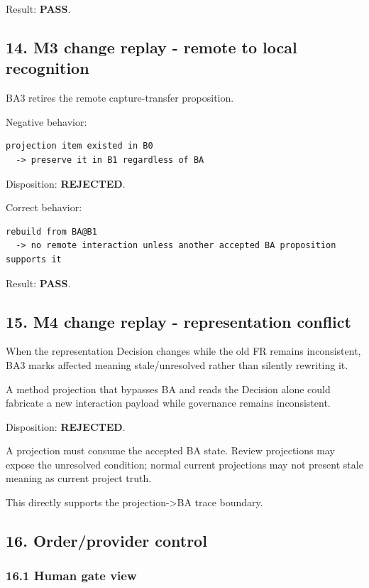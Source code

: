 \documentclass[11pt,a4paper]{article}
\begin{document}
Result: \textbf{PASS}.

\subsection{14. M3 change replay - remote to local recognition}\label{14-m3-change-replay---remote-to-local-recognition}

BA3 retires the remote capture-transfer proposition.

Negative behavior:

\begin{verbatim}
projection item existed in B0
  -> preserve it in B1 regardless of BA
\end{verbatim}

Disposition: \textbf{REJECTED}.

Correct behavior:

\begin{verbatim}
rebuild from BA@B1
  -> no remote interaction unless another accepted BA proposition supports it
\end{verbatim}

Result: \textbf{PASS}.

\subsection{15. M4 change replay - representation conflict}\label{15-m4-change-replay---representation-conflict}

When the representation Decision changes while the old FR remains inconsistent, BA3 marks affected meaning stale/unresolved rather than silently rewriting it.

A method projection that bypasses BA and reads the Decision alone could fabricate a new interaction payload while governance remains inconsistent.

Disposition: \textbf{REJECTED}.

A projection must consume the accepted BA state. Review projections may expose the unresolved condition; normal current projections may not present stale meaning as current project truth.

This directly supports the projection-\textgreater BA trace boundary.

\subsection{16. Order/provider control}\label{16-orderprovider-control}

\subsubsection{16.1 Human gate view}\label{161-human-gate-view}
\end{document}
